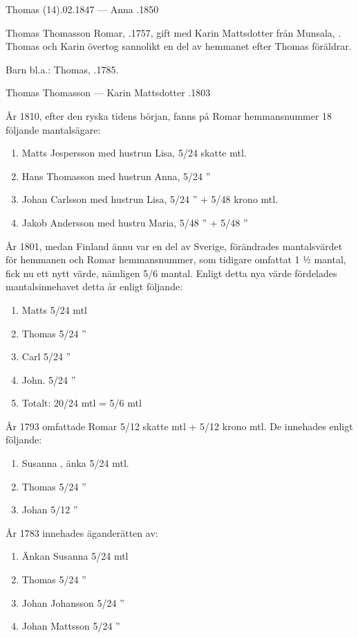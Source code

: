 Thomas (14).02.1847  ---  Anna .1850


%
Thomas Thomasson Romar, .1757, gift med Karin Mattsdotter från Munsala, . Thomas och Karin övertog sannolikt en del av hemmanet efter Thomas föräldrar.

Barn bl.a.: Thomas, .1785.

Thomas Thomasson   ---  Karin Mattsdotter .1803


År 1810, efter den ryska tidens början, fanns på Romar hemmansnummer 18 följande mantalsägare:
\begin{enumerate}
  \item Matts Jespersson med hustrun Lisa, 5/24 skatte mtl.
  \item Hans Thomasson med hustrun Anna,   5/24      ”
  \item Johan Carlsson med hustrun Lisa,   5/24      ”       + 5/48 krono mtl.
  \item Jakob Andersson med hustru Maria,  5/48      ”       + 5/48     ”
\end{enumerate}

År 1801, medan Finland ännu var en del av Sverige, förändrades mantalsvärdet för hemmanen och Romar hemmansnummer, som tidigare omfattat 1 ½ mantal, fick nu ett nytt värde, nämligen 5/6 mantal. Enligt detta nya värde fördelades mantalsinnehavet detta år enligt följande:
\begin{enumerate}
  \item Matts       5/24 mtl
  \item Thomas      5/24  ”
  \item Carl        5/24  ”
  \item John.       5/24  ”
  \item Totalt:   20/24 mtl = 5/6 mtl
\end{enumerate}

År 1793 omfattade Romar 5/12 skatte mtl + 5/12 krono mtl. De innehades enligt följande:
\begin{enumerate}
  \item Susanna , änka 5/24 mtl.
  \item Thomas         5/24  ”
  \item Johan          5/12  ”
\end{enumerate}

År 1783 innehades äganderätten av:
\begin{enumerate}
  \item Änkan Susanna    5/24  mtl
  \item Thomas           5/24   ”
  \item Johan Johansson  5/24   ”
  \item Johan Mattsson   5/24   ”
\end{enumerate}



